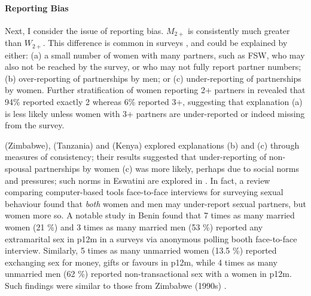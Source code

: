 \paragraph{Reporting Bias}
Next, I consider the issue of reporting bias.
$M_{2+}$ is consistently much greater than $W_{2+}$.
This difference is common in surveys \cite{Todd2009,Higgins2010}, and could be explained by either:
(a) a small number of women with many partners,
such as FSW, who may also not be reached by the survey,
or who may not fully report partner numbers;
(b) over-reporting of partnerships by men; or
(c) under-reporting of partnerships by women.
Further stratification of women reporting 2+ partners in \cite[Table~14.7.1]{SDHS2006}
revealed that 94\% reported exactly 2 whereas 6\% reported 3+,
suggesting that explanation (a) is less likely unless
women with 3+ partners are under-reported or indeed missing from the survey.
\par
\citet{Gregson2002} (Zimbabwe), \citet{Nnko2004} (Tanzania) and \citet{Clark2011} (Kenya)
explored explanations (b) and (c) through measures of consistency; their results suggested that
under-reporting of non-spousal partnerships by women (c) was more likely,
perhaps due to social norms and pressures;
such norms in Eswatini are explored in \cite{Ruark2019,Pulerwitz2021}.
In fact, a review comparing computer-based tools \vs face-to-face interviews
for surveying sexual behaviour \cite{Langhaug2010} found that
\emph{both} women and men may under-report sexual partners, but women more so.
A notable study in Benin \cite{Behanzin2013} found that
7 times as many married women (21 \%) and 3 times as many married men (53 \%)
reported any extramarital sex in p12m
in a surveys via anonymous polling booth \vs face-to-face interview.
Similarly, 5 times as many unmarried women (13.5 \%) reported
exchanging sex for money, gifts or favours in p12m, while
4 times as many unmarried men (62 \%) reported non-transactional sex with a women in p12m.
Such findings were similar to those from Zimbabwe (1990s) \cite{Gregson2002}.
